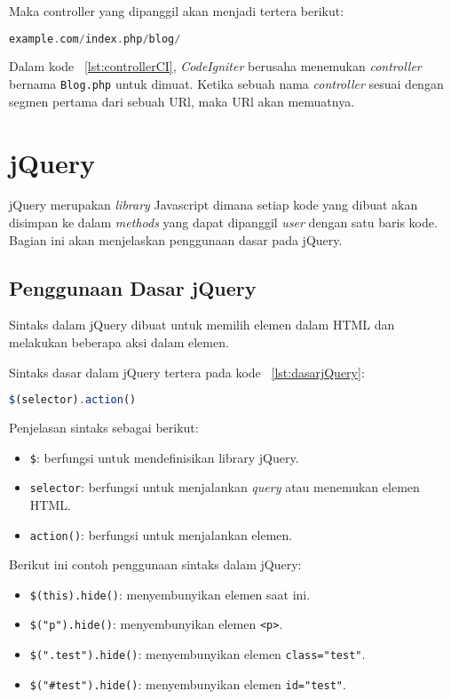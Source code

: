 Maka controller yang dipanggil akan menjadi tertera berikut:
\begin{lstlisting}[style=customphp, language=PHP, basicstyle=\ttfamily, frame=single, columns=fullflexible, keepspaces=true, breaklines=true, showstringspaces=false, label={lst:controllerCI}, caption=Controller pada codeIgniter.] 
example.com/index.php/blog/
\end{lstlisting}

Dalam kode ~\ref{lst:controllerCI}, \textit{CodeIgniter} berusaha menemukan \textit{controller} bernama \texttt{Blog.php} untuk dimuat. Ketika sebuah nama \textit{controller} sesuai dengan segmen pertama dari sebuah URl, maka URl akan memuatnya. 


\section{jQuery}

jQuery merupakan \textit{library} Javascript dimana setiap kode yang dibuat akan disimpan ke dalam \textit{methods} yang dapat dipanggil \textit{user} dengan satu baris kode. Bagian ini akan menjelaskan penggunaan dasar pada jQuery. \cite{jquery}

\subsection{Penggunaan Dasar jQuery}
\noindent Sintaks dalam jQuery dibuat untuk memilih elemen dalam HTML dan melakukan beberapa aksi dalam elemen. 

Sintaks dasar dalam jQuery tertera pada kode ~\ref{lst:dasarjQuery}:
\begin{lstlisting}[style=JavaScript, language=JavaScript, basicstyle=\ttfamily, frame=single, columns=fullflexible, keepspaces=true, breaklines=true, showstringspaces=false, label={lst:dasarjQuery}, caption=Pemanggilan jQuery.]
$(selector).action()
\end{lstlisting}
Penjelasan sintaks sebagai berikut:
\begin{itemize}
	\item \texttt{\$}: berfungsi untuk mendefinisikan library jQuery.
	\item \texttt{selector}: berfungsi untuk menjalankan \textit{query} atau menemukan elemen HTML.
	\item \texttt{action()}: berfungsi untuk menjalankan elemen.
\end{itemize}



Berikut ini contoh penggunaan sintaks dalam jQuery:
\begin{itemize}
	\item \texttt{\$(this).hide()}: menyembunyikan elemen saat ini.
	\item \texttt{\$("p").hide()}: menyembunyikan elemen \texttt{<p>}.
	\item \texttt{\$(".test").hide()}: menyembunyikan elemen \texttt{class="test"}.
	\item \texttt{\$("\#test").hide()}: menyembunyikan elemen \texttt{id="test"}.
\end{itemize}

